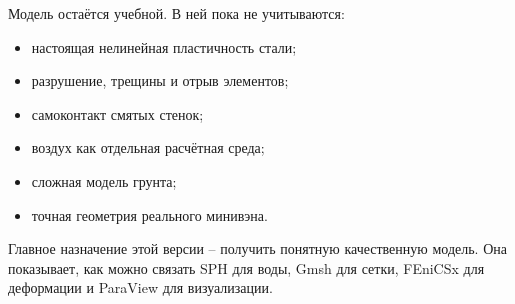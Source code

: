 \documentclass[12pt,a4paper]{article}
\begin{document}
Модель остаётся учебной. В ней пока не учитываются:

\begin{itemize}
  \item настоящая нелинейная пластичность стали;
  \item разрушение, трещины и отрыв элементов;
  \item самоконтакт смятых стенок;
  \item воздух как отдельная расчётная среда;
  \item сложная модель грунта;
  \item точная геометрия реального минивэна.
\end{itemize}

Главное назначение этой версии -- получить понятную качественную модель. Она
показывает, как можно связать SPH для воды, Gmsh для сетки, FEniCSx для
деформации и ParaView для визуализации.
\end{document}
